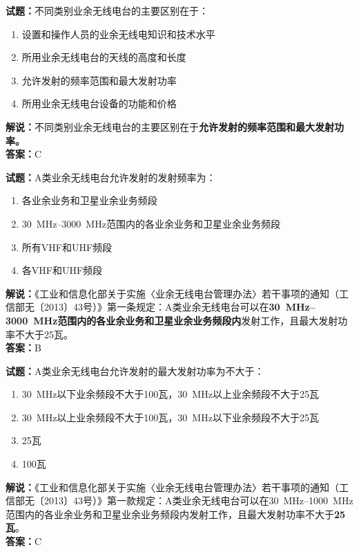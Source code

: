 \documentclass{ctexbook}
\begin{document}
\vspace{\baselineskip}

\noindent\textbf{试题：}不同类别业余无线电台的主要区别在于：
\begin{enumerate}[leftmargin=3em]
  \item 设置和操作人员的业余无线电知识和技术水平
  \item 所用业余无线电台的天线的高度和长度
  \item 允许发射的频率范围和最大发射功率
  \item 所用业余无线电台设备的功能和价格
\end{enumerate}
\noindent\textbf{解说：}不同类别业余无线电台的主要区别在于\textbf{允许发射的频率范围和最大发射功率。}\\\noindent\textbf{答案：}C

\vspace{\baselineskip}

\noindent\textbf{试题：}A类业余无线电台允许发射的发射频率为：
\begin{enumerate}[leftmargin=3em]
  \item 各业余业务和卫星业余业务频段
  \item \qtyrange{30}{3000}{\MHz}范围内的各业余业务和卫星业余业务频段
  \item 所有VHF和UHF频段
  \item 各VHF和UHF频段
\end{enumerate}
\noindent\textbf{解说：}《工业和信息化部关于实施〈业余无线电台管理办法〉若干事项的通知（工信部无〔2013〕43号）》第一条规定：A类业余无线电台可以在\textbf{\qtyrange{30}{3000}{\MHz}范围内的各业余业务和卫星业余业务频段内}发射工作，且最大发射功率不大于\num{25}瓦。\\\noindent\textbf{答案：}B

\vspace{\baselineskip}

\noindent\textbf{试题：}A类业余无线电台允许发射的最大发射功率为不大于：
\begin{enumerate}[leftmargin=3em]
  \item \qty{30}{\MHz}以下业余频段不大于\num{100}瓦，\qty{30}{\MHz}以上业余频段不大于\num{25}瓦
  \item \qty{30}{\MHz}以上业余频段不大于\num{100}瓦，\qty{30}{\MHz}以下业余频段不大于\num{25}瓦
  \item \num{25}瓦
  \item \num{100}瓦
\end{enumerate}
\noindent\textbf{解说：}《工业和信息化部关于实施〈业余无线电台管理办法〉若干事项的通知（工信部无〔2013〕43号）》第一款规定：A类业余无线电台可以在\qtyrange{30}{1000}{\MHz}范围内的各业余业务和卫星业余业务频段内发射工作，且最大发射功率不大于\textbf{\num{25}瓦}。\\\noindent\textbf{答案：}C
\end{document}
